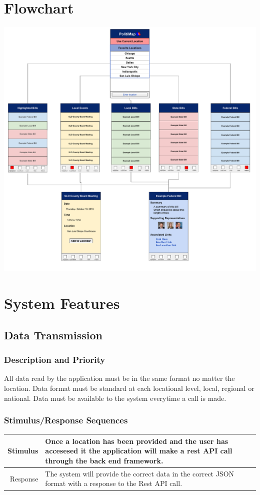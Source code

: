 \documentclass[12pt,oneside,letterpaper]{article}
\begin{document}
\section{Flowchart}
\includegraphics[width=\textwidth]{Flowchart__1_.pdf}

\section{System Features}

\subsection{Data Transmission}
\subsubsection{Description and Priority}
All data read by the application must be in the same format no matter the location. Data format must be standard at each locational level, local, regional or national. Data must be available to the system everytime a call is made.
\subsubsection{Stimulus/Response Sequences}
\begin{longtable}{|r|p{3.8in}|}
\hline
Stimulus & Once a location has been provided and the user has accesesed it the application will make a rest API call through the back end framework.\\
\hline
Response & The system will provide the correct data in the correct JSON format with a response to the Rest API call.\\
\hline
\end{longtable}
\end{document}
